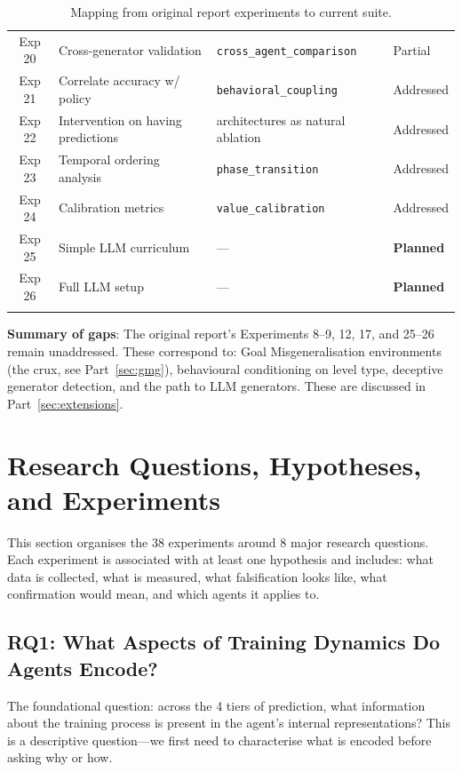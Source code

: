 \documentclass[11pt,a4paper]{article}
\theoremstyle{remark}
\begin{document}
\begin{longtable}{c >{\raggedright\arraybackslash}p{4cm} >{\raggedright\arraybackslash}p{5.5cm} l}
Exp 20 & Cross-generator validation & \texttt{cross\_agent\_comparison} & Partial \\
Exp 21 & Correlate accuracy w/ policy & \texttt{behavioral\_coupling} & Addressed \\
Exp 22 & Intervention on having predictions & 5 architectures as natural ablation & Addressed \\
Exp 23 & Temporal ordering analysis & \texttt{phase\_transition} & Addressed \\
Exp 24 & Calibration metrics & \texttt{value\_calibration} & Addressed \\
Exp 25 & Simple LLM curriculum & --- & \textbf{Planned} \\
Exp 26 & Full LLM setup & --- & \textbf{Planned} \\
\bottomrule
\caption{Mapping from original report experiments to current suite.}
\end{longtable}

\textbf{Summary of gaps}: The original report's Experiments 8--9, 12, 17, and 25--26 remain unaddressed. These correspond to: Goal Misgeneralisation environments (the crux, see Part~\ref{sec:gmg}), behavioural conditioning on level type, deceptive generator detection, and the path to LLM generators. These are discussed in Part~\ref{sec:extensions}.


\section{Research Questions, Hypotheses, and Experiments}
\label{sec:rqs}

This section organises the 38 experiments around 8 major research questions. Each experiment is associated with at least one hypothesis and includes: what data is collected, what is measured, what falsification looks like, what confirmation would mean, and which agents it applies to.

\subsection{RQ1: What Aspects of Training Dynamics Do Agents Encode?}
\label{sec:rq1}

The foundational question: across the 4 tiers of prediction, what information about the training process is present in the agent's internal representations? This is a descriptive question---we first need to characterise what is encoded before asking why or how.
\end{document}
